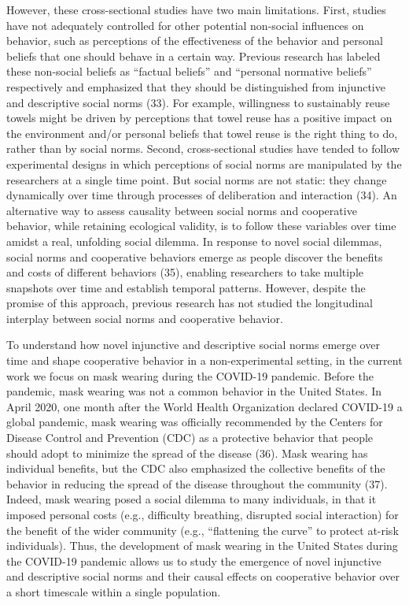 \documentclass[
  man, donotrepeattitle,floatsintext]{apa6}
\begin{document}
However, these cross-sectional studies have two main limitations. First, studies have not adequately controlled for other potential non-social influences on behavior, such as perceptions of the effectiveness of the behavior and personal beliefs that one should behave in a certain way. Previous research has labeled these non-social beliefs as ``factual beliefs'' and ``personal normative beliefs'' respectively and emphasized that they should be distinguished from injunctive and descriptive social norms (33). For example, willingness to sustainably reuse towels might be driven by perceptions that towel reuse has a positive impact on the environment and/or personal beliefs that towel reuse is the right thing to do, rather than by social norms. Second, cross-sectional studies have tended to follow experimental designs in which perceptions of social norms are manipulated by the researchers at a single time point. But social norms are not static: they change dynamically over time through processes of deliberation and interaction (34). An alternative way to assess causality between social norms and cooperative behavior, while retaining ecological validity, is to follow these variables over time amidst a real, unfolding social dilemma. In response to novel social dilemmas, social norms and cooperative behaviors emerge as people discover the benefits and costs of different behaviors (35), enabling researchers to take multiple snapshots over time and establish temporal patterns. However, despite the promise of this approach, previous research has not studied the longitudinal interplay between social norms and cooperative behavior.

To understand how novel injunctive and descriptive social norms emerge over time and shape cooperative behavior in a non-experimental setting, in the current work we focus on mask wearing during the COVID-19 pandemic. Before the pandemic, mask wearing was not a common behavior in the United States. In April 2020, one month after the World Health Organization declared COVID-19 a global pandemic, mask wearing was officially recommended by the Centers for Disease Control and Prevention (CDC) as a protective behavior that people should adopt to minimize the spread of the disease (36). Mask wearing has individual benefits, but the CDC also emphasized the collective benefits of the behavior in reducing the spread of the disease throughout the community (37). Indeed, mask wearing posed a social dilemma to many individuals, in that it imposed personal costs (e.g., difficulty breathing, disrupted social interaction) for the benefit of the wider community (e.g., ``flattening the curve'' to protect at-risk individuals). Thus, the development of mask wearing in the United States during the COVID-19 pandemic allows us to study the emergence of novel injunctive and descriptive social norms and their causal effects on cooperative behavior over a short timescale within a single population.
\end{document}
